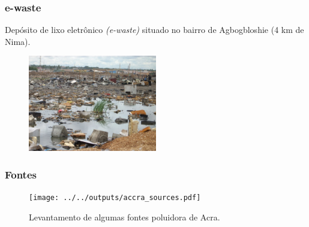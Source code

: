 \begin{frame}
  \frametitle{e-waste}
  Depósito de lixo eletrônico \textit{(e-waste)} situado no bairro 
  de Agbogbloshie (4 km de Nima).
  \begin{figure}[H]
    \centering
    \includegraphics[width=0.5\textwidth]{../../inputs/images/ewaste_jack_caravano.jpg}
  \end{figure}
\end{frame}

\begin{frame}
	\frametitle{Fontes}
	\begin{figure}[H]
		\centering	
		\texttt{[image: ../../outputs/accra\_sources.pdf]}
		\caption{Levantamento de algumas fontes poluidora de Acra.
			\label{fg:acrasources}}
	\end{figure}
\end{frame}
